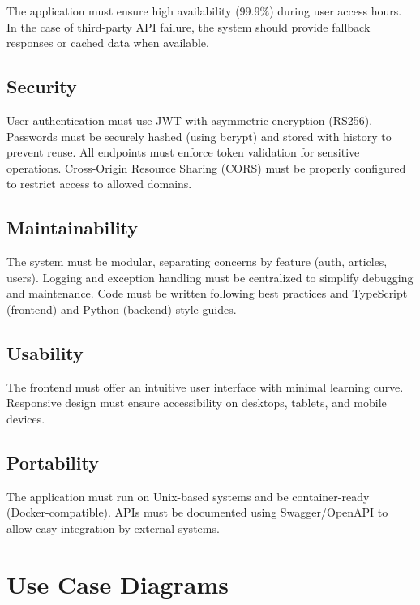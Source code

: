 The application must ensure high availability (99.9\%) during user access hours.
In the case of third-party API failure, the system should provide fallback responses or cached data when available.

\subsection{Security}\label{subsec:security}

User authentication must use JWT with asymmetric encryption (RS256).
Passwords must be securely hashed (using bcrypt) and stored with history to prevent reuse.
All endpoints must enforce token validation for sensitive operations.
Cross-Origin Resource Sharing (CORS) must be properly configured to restrict access to allowed domains.

\subsection{Maintainability}\label{subsec:maintainability}

The system must be modular, separating concerns by feature (auth, articles, users).
Logging and exception handling must be centralized to simplify debugging and maintenance.
Code must be written following best practices and TypeScript (frontend) and Python (backend) style guides.

\subsection{Usability}\label{subsec:usability}

The frontend must offer an intuitive user interface with minimal learning curve.
Responsive design must ensure accessibility on desktops, tablets, and mobile devices.

\subsection{Portability}\label{subsec:portability}

The application must run on Unix-based systems and be container-ready (Docker-compatible).
APIs must be documented using Swagger/OpenAPI to allow easy integration by external systems.


\section{Use Case Diagrams}\label{sec:use-case-diagrams}

